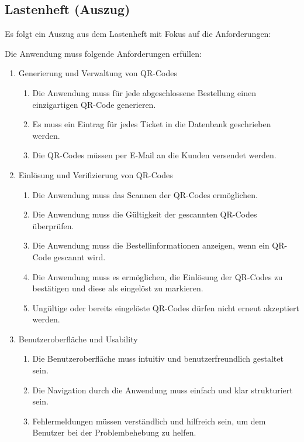 \subsection{Lastenheft (Auszug)}
\label{app:Lastenheft}
Es folgt ein Auszug aus dem Lastenheft mit Fokus auf die Anforderungen:

Die Anwendung muss folgende Anforderungen erfüllen:
\begin{enumerate}[itemsep=0em,partopsep=0em,parsep=0em,topsep=0em]
    \item Generierung und Verwaltung von QR-Codes
    \begin{enumerate}
        \item Die Anwendung muss für jede abgeschlossene Bestellung einen einzigartigen QR-Code generieren.
        \item Es muss ein Eintrag für jedes Ticket in die Datenbank geschrieben werden.
        \item Die QR-Codes müssen per E-Mail an die Kunden versendet werden.
    \end{enumerate}

    \item Einlösung und Verifizierung von QR-Codes
    \begin{enumerate}
        \item Die Anwendung muss das Scannen der QR-Codes ermöglichen.
        \item Die Anwendung muss die Gültigkeit der gescannten QR-Codes überprüfen.
        \item Die Anwendung muss die Bestellinformationen anzeigen, wenn ein QR-Code gescannt wird.
        \item Die Anwendung muss es ermöglichen, die Einlösung der QR-Codes zu bestätigen und diese als eingelöst zu markieren.
        \item Ungültige oder bereits eingelöste QR-Codes dürfen nicht erneut akzeptiert werden.
    \end{enumerate}

    \item Benutzeroberfläche und Usability
    \begin{enumerate}
        \item Die Benutzeroberfläche muss intuitiv und benutzerfreundlich gestaltet sein.
        \item Die Navigation durch die Anwendung muss einfach und klar strukturiert sein.
        \item Fehlermeldungen müssen verständlich und hilfreich sein, um dem Benutzer bei der Problembehebung zu helfen.
    \end{enumerate}


\end{enumerate}
